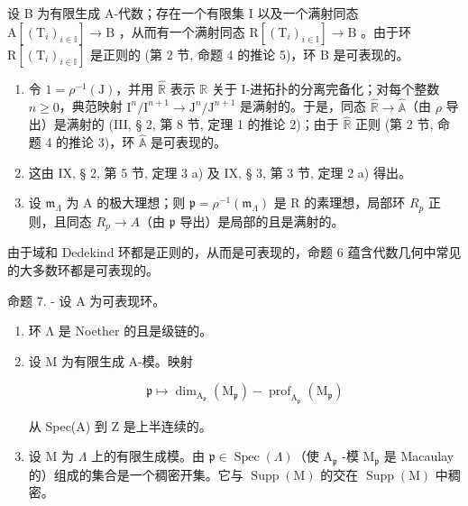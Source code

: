 设 B 为有限生成 A-代数；存在一个有限集 I 以及一个满射同态 \(\mathrm{A}[(\mathrm{T}_{i})_{i\in\mathbb{I}}]\to\mathrm{B}\) ，从而有一个满射同态 \(\mathrm{R}[(\mathrm{T}_{i})_{i\in\mathbb{I}}]\to\mathrm{B}\) 。由于环 \(\mathrm{R}[(\mathrm{T}_{i})_{i\in\mathbb{I}}]\) 是正则的 (第 2 节, 命题 4 的推论 5)，环 B 是可表现的。

\begin{enumerate}
\def\labelenumi{\alph{enumi})}
\setcounter{enumi}{1}
\item
  令 \(1 = \rho^{-1}(\mathrm{J})\)，并用 \(\widehat{\mathbb{R}}\) 表示 \(\mathbb{R}\) 关于 I-进拓扑的分离完备化；对每个整数 \(n \geqslant 0\)，典范映射 \(\mathrm{I}^n / \mathrm{I}^{n+1} \to \mathrm{J}^n / \mathrm{J}^{n+1}\) 是满射的。于是，同态 \(\widehat{\mathbb{R}} \to \widehat{\mathbb{A}}\)（由 \(\rho\) 导出）是满射的 (III, § 2, 第 8 节, 定理 1 的推论 2)；由于 \(\widehat{\mathbb{R}}\) 正则 (第 2 节, 命题 4 的推论 3)，环 \(\widehat{\mathbb{A}}\) 是可表现的。
\item
  这由 IX, § 2, 第 5 节, 定理 3 a) 及 IX, § 3, 第 3 节, 定理 2 a) 得出。
\item
  设 \(\mathfrak{m}_{\Lambda}\) 为 A 的极大理想；则 \(\mathfrak{p} = \mathfrak{\rho}^{-1}(\mathfrak{m}_{\Lambda})\) 是 R 的素理想，局部环 \(R_{p}\) 正则，且同态 \(R_{p} \to A\)（由 \(\mathfrak{p}\) 导出）是局部的且是满射的。
\end{enumerate}

由于域和 Dedekind 环都是正则的，从而是可表现的，命题 6 蕴含代数几何中常见的大多数环都是可表现的。

命题 7. - 设 A 为可表现环。

\begin{enumerate}
\def\labelenumi{\alph{enumi})}
\item
  环 Λ 是 Noether 的且是级链的。
\item
  设 M 为有限生成 A-模。映射

\[
\mathfrak {p} \mapsto \dim_ {\mathrm{A} _ {\mathfrak {p}}} (\mathrm{M} _ {\mathfrak {p}}) - \operatorname{prof} _ {\mathrm{A} _ {\mathfrak {p}}} (\mathrm{M} _ {\mathfrak {p}})
\]

从 Spec(A) 到 Z 是上半连续的。

\item
  设 M 为 \(\Lambda\) 上的有限生成模。由 \(\mathfrak{p} \in \operatorname{Spec}(\Lambda)\)（使 \(\mathrm{A}_{\mathfrak{p}}\) -模 \(\mathrm{M}_{\mathfrak{p}}\) 是 Macaulay 的）组成的集合是一个稠密开集。它与 \(\operatorname{Supp}(\mathrm{M})\) 的交在 \(\operatorname{Supp}(\mathrm{M})\) 中稠密。
\end{enumerate}

